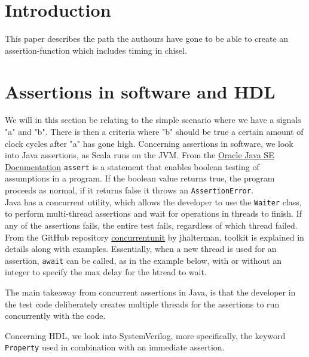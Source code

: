 \documentclass[b5paper]{article}
\begin{document}
\section{Introduction}

This paper describes the path the authours have gone to be able to create an assertion-function which includes timing in chisel.

\section{Assertions in software and HDL}

We will in this section be relating to the simple scenario where we have a signals "a" and "b". There is then a criteria where "b" should be true a certain amount of clock cycles after "a" has gone high.
\smallskip
Concerning assertions in software, we look into Java assertions, as Scala runs on the JVM.
From the \href{https://docs.oracle.com/javase/7/docs/technotes/guides/language/assert.html}{\color{blue}Oracle Java SE Documentation} \texttt{assert} is a statement that enables boolean testing of assumptions in a program. If the boolean value returns true, the program proceeds as normal, if it returns false it throws an \texttt{AssertionError}.\\
Java has a concurrent utility, which allows the developer to use the \texttt{Waiter}
class, to perform multi-thread assertions and wait for operations in threads to finish. If any of the assertions fails, the entire test fails, regardless of which thread failed. From the GitHub repository \href{https://github.com/jhalterman/concurrentunit}{\color{blue}concurrentunit} by jhalterman, toolkit is explained in details along with examples. Essentially, when a new thread is used for an assertion, \texttt{await} can be called, as in the example below, with or without an integer to specify the max delay for the htread to wait.

The main takeaway from concurrent assertions in Java, is that the developer in the test code deliberately creates multiple threads for the assertions to run concurrently with the code.\\
\smallskip

Concerning HDL, we look into SystemVerilog, more specifically, the keyword \texttt{Property} used in combination with an immediate assertion.
\end{document}
